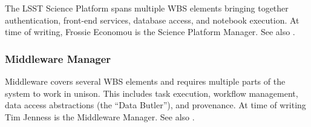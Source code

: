 The \gls{LSST} \gls{Science Platform} spans multiple \gls{WBS} elements bringing together authentication, front-end services, database access, and notebook execution.
At time of writing, Frossie Economou is the \gls{Science Platform} Manager.
See also .

\subsubsection{Middleware Manager}\label{role:mwlead}

Middleware covers several \gls{WBS} elements and requires multiple parts of the system to work in unison.
This includes task execution, workflow management, data access abstractions (the ``Data \gls{Butler}''), and \gls{provenance}.
At time of writing Tim Jenness is the Middleware Manager.
See also .
